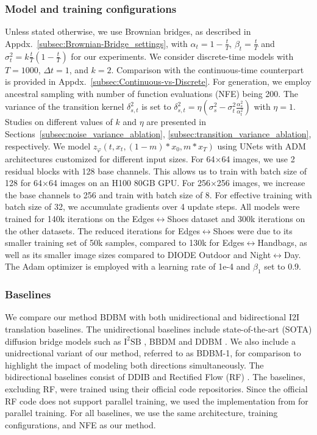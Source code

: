\subsubsection{Model and training configurations\label{subsec:Model-and-training}}

Unless stated otherwise, we use Brownian bridges, as described in
Appdx.~\ref{subsec:Brownian-Bridge_settings}, with $\alpha_{t}=1-\frac{t}{T}$,
$\beta_{t}=\frac{t}{T}$ and $\sigma_{t}^{2}=k\frac{t}{T}\left(1-\frac{t}{T}\right)$
for our experiments. We consider discrete-time models with $T=1000$,
$\Delta t=1$, and $k=2$. Comparison with the continuous-time counterpart
is provided in Appdx.~\ref{subsec:Continuous-vs-Discrete}. For generation,
we employ ancestral sampling with number of function evaluations (NFE)
being 200. The variance of the transition kernel $\delta_{s,t}^{2}$
is set to $\delta_{s,t}^{2}=\eta\left(\sigma_{s}^{2}-\sigma_{t}^{2}\frac{\alpha_{s}^{2}}{\alpha_{t}^{2}}\right)$
with $\eta=1$. Studies on different values of $k$ and $\eta$ are
presented in Sections~\ref{subsec:noise_variance_ablation}, \ref{subsec:transition_variance_ablation},
respectively. We model $z_{\varphi}\left(t,x_{t},\left(1-m\right)*x_{0},m*x_{T}\right)$
using UNets with ADM architectures \cite{dhariwal2021diffusion} customized
for different input sizes. For 64$\times$64 images, we use 2 residual
blocks with 128 base channels. This allows us to train with batch
size of 128 for 64$\times$64 images on an H100 80GB GPU. For 256$\times$256
images, we increase the base channels to 256 and train with batch
size of 8. For effective training with batch size of 32, we accumulate
gradients over 4 update steps. All models were trained for 140k iterations
on the Edges$\leftrightarrow$Shoes dataset and 300k iterations on
the other datasets. The reduced iterations for Edges$\leftrightarrow$Shoes
were due to its smaller training set of 50k samples, compared to 130k
for Edges$\leftrightarrow$Handbags, as well as its smaller image
sizes compared to DIODE Outdoor and Night$\leftrightarrow$Day. The
Adam optimizer \cite{KingmaB14} is employed with a learning rate
of 1e-4 and $\beta_{1}$ set to 0.9.

\subsubsection{Baselines}

We compare our method BDBM with both unidirectional and bidirectional
I2I translation baselines. The unidirectional baselines include state-of-the-art
(SOTA) diffusion bridge models such as $\text{I}^{2}\text{SB}$ \cite{LiuVHTNA23},
BBDM \cite{LiX0L23} and DDBM \cite{zhou2024denoising}. We also include
a unidrectional variant of our method, referred to as BDBM-1, for
comparison to highlight the impact of modeling both directions simultaneously.
The bidirectional baselines consist of DDIB \cite{su2023dual} and
Rectified Flow (RF) \cite{liu2022flow}. The baselines, excluding
RF, were trained using their official code repositories. Since the
official RF code does not support parallel training, we used the implementation
from \cite{lee2023minimizing} for parallel training. For all baselines,
we use the same architecture, training configurations, and NFE as
our method.

